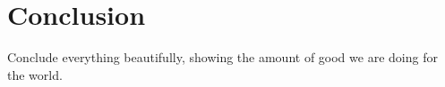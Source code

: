 


\section{Conclusion}

Conclude everything beautifully, showing the amount of good we are doing for the world.



